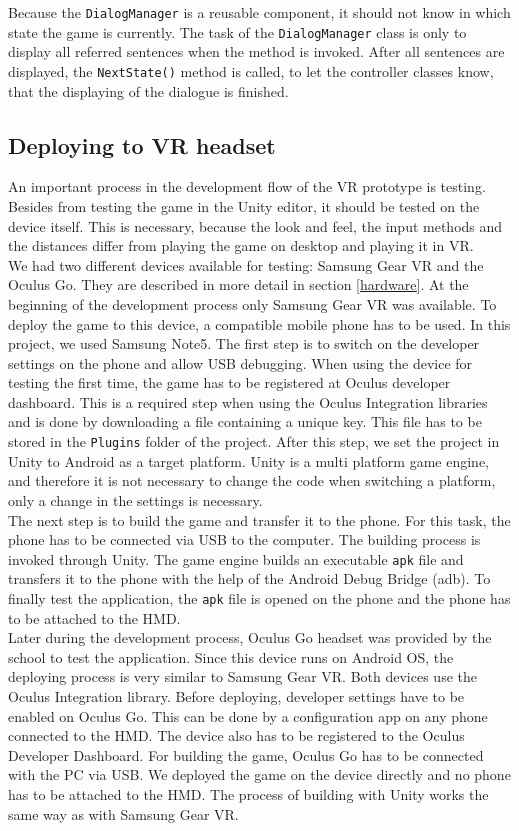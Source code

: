 Because the \texttt{DialogManager} is a reusable component, it should not know in which state the game is currently. The task of the \texttt{DialogManager} class is only to display all referred sentences when the method is invoked. After all sentences are displayed, the \texttt{NextState()} method is called, to let the controller classes know, that the displaying of the dialogue is finished. 

\newpage
\subsection{Deploying to VR headset}
An important process in the development flow of the VR prototype is testing. Besides from testing the game in the Unity editor, it should be tested on the device itself. This is necessary, because the look and feel, the input methods and the distances differ from playing the game on desktop and playing it in VR.\\
We had two different devices available for testing: Samsung Gear VR and the Oculus Go. They are described in more detail in section \ref{hardware}. At the beginning of the development process only Samsung Gear VR was available. To deploy the game to this device, a compatible mobile phone has to be used. In this project, we used Samsung Note5. The first step is to switch on the developer settings on the phone and allow USB debugging. When using the device for testing the first time, the game has to be registered at Oculus developer dashboard. This is a required step when using the Oculus Integration libraries and is done by downloading a file containing a unique key. This file has to be stored in the \texttt{Plugins} folder of the project.
After this step, we set the project in Unity to Android as a target platform. Unity is a multi platform game engine, and therefore it is not necessary to change the code when switching a platform, only a change in the settings is necessary.\\
The next step is to build the game and transfer it to the phone. For this task, the phone has to be connected via USB to the computer. The building process is invoked through Unity. The game engine builds an executable \texttt{apk} file and transfers it to the phone with the help of the Android Debug Bridge (adb). To finally test the application, the \texttt{apk} file is opened on the phone and the phone has to be attached to the HMD.\\
Later during the development process, Oculus Go headset was provided by the school to test the application. Since this device runs on Android OS, the deploying process is very similar to Samsung Gear VR. Both devices use the Oculus Integration library. Before deploying, developer settings have to be enabled on Oculus Go. This can be done by a configuration app on any phone connected to the HMD. The device also has to be registered to the Oculus Developer Dashboard. For building the game, Oculus Go has to be connected with the PC via USB. We deployed the game on the device directly and no phone has to be attached to the HMD. The process of building with Unity works the same way as with Samsung Gear VR.\\
